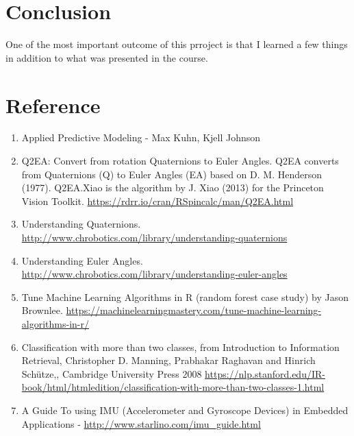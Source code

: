 \documentclass[]{article}
\begin{document}
\hypertarget{conclusion}{%
\section{Conclusion}\label{conclusion}}

One of the most important outcome of this prroject is that I learned a
few things in addition to what was presented in the course.

\hypertarget{reference}{%
\section{Reference}\label{reference}}

\begin{enumerate}
\def\labelenumi{\arabic{enumi}.}
\item
  Applied Predictive Modeling - Max Kuhn, Kjell Johnson
\item
  Q2EA: Convert from rotation Quaternions to Euler Angles. Q2EA converts
  from Quaternions (Q) to Euler Angles (EA) based on D. M. Henderson
  (1977). Q2EA.Xiao is the algorithm by J. Xiao (2013) for the Princeton
  Vision Toolkit. \url{https://rdrr.io/cran/RSpincalc/man/Q2EA.html}
\item
  Understanding Quaternions.
  \url{http://www.chrobotics.com/library/understanding-quaternions}
\item
  Understanding Euler Angles.
  \url{http://www.chrobotics.com/library/understanding-euler-angles}
\item
  Tune Machine Learning Algorithms in R (random forest case study) by
  Jason Brownlee.
  \url{https://machinelearningmastery.com/tune-machine-learning-algorithms-in-r/}
\item
  Classification with more than two classes, from Introduction to
  Information Retrieval, Christopher D. Manning, Prabhakar Raghavan and
  Hinrich Schütze,, Cambridge University Press 2008
  \url{https://nlp.stanford.edu/IR-book/html/htmledition/classification-with-more-than-two-classes-1.html}
\item
  A Guide To using IMU (Accelerometer and Gyroscope Devices) in Embedded
  Applications - \url{http://www.starlino.com/imu_guide.html}
\end{enumerate}
\end{document}
